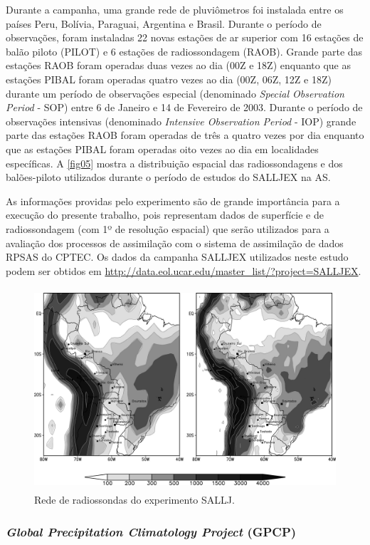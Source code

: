 Durante a campanha, uma grande rede de pluviômetros foi instalada entre os países Peru, Bolívia, Paraguai, Argentina e Brasil. Durante o período de observações, foram instaladas 22 novas estações de ar superior com 16 estações de balão piloto (PILOT) e 6 estações de radiossondagem (RAOB). Grande parte das estações RAOB foram operadas duas vezes ao dia (00Z e 18Z) enquanto que as estações PIBAL foram operadas quatro vezes ao dia (00Z, 06Z, 12Z e 18Z) durante um período de observações especial (denominado \textit{Special Observation Period} - SOP) entre 6 de Janeiro e 14 de Fevereiro de 2003. Durante o período de observações intensivas (denominado \textit{Intensive Observation Period} - IOP) grande parte das estações RAOB foram operadas de três a quatro vezes por dia enquanto que as estações PIBAL foram operadas oito vezes ao dia em localidades específicas. A \autoref{fig05} mostra a distribuição espacial das radiossondagens e dos balões-piloto utilizados durante o período de estudos do SALLJEX na AS. 

As informações providas pelo experimento são de grande importância para a execução do presente trabalho, pois representam dados de superfície e de radiossondagem (com 1º de resolução espacial) que serão utilizados para a avaliação dos processos de assimilação com o sistema de assimilação de dados RPSAS do CPTEC. Os dados da campanha SALLJEX utilizados neste estudo podem ser obtidos em \url{http://data.eol.ucar.edu/master_list/?project=SALLJEX}.

\begin{figure}[!hpb]
\centering
\includegraphics[height=7.5cm]{./figs/rede-salljex.png}
\caption{Rede de radiossondas do experimento SALLJ.}
\label{fig05}
\end{figure}

\subsubsection{\textit{Global Precipitation Climatology Project} (GPCP)}

